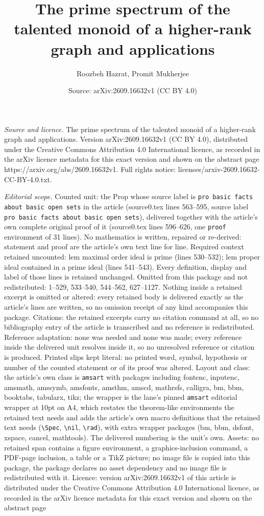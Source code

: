 \documentclass[10pt,a4paper]{amsart}
\title[The prime spectrum of the talented monoid of a higher-rank g]{The prime spectrum of the talented monoid of a higher-rank graph and applications}
\author{Roozbeh Hazrat, Promit Mukherjee}
\date{Source: arXiv:2609.16632v1 (CC BY 4.0)}
\begin{document}
\maketitle

\noindent\emph{Source and licence.} The prime spectrum of the talented monoid of a higher-rank graph and applications. Version arXiv:2609.16632v1 (CC BY 4.0), distributed under the Creative Commons Attribution 4.0 International licence, as recorded in the arXiv licence metadata for this exact version and shown on the abstract page https://arxiv.org/abs/2609.16632v1. Full rights notice: licenses/arxiv-2609.16632-CC-BY-4.0.txt.\par\smallskip

\noindent\textit{Editorial scope.} Counted unit: the Prop whose source label is \texttt{pro basic facts about basic open sets} in the article (source0.tex lines 563--595, source label \texttt{pro basic facts about basic open sets}), delivered together with the article's own complete original proof of it (source0.tex lines 596--626, one \texttt{proof} environment of 31 lines). No mathematics is written, repaired or re-derived: statement and proof are the article's own text line for line. Required context retained uncounted: lem maximal order ideal is prime (lines 530--532); lem proper ideal contained in a prime ideal (lines 541--543). Every definition, display and label of those lines is retained unchanged. Omitted from this package and not redistributed: 1--529, 533--540, 544--562, 627--1127. Nothing inside a retained excerpt is omitted or altered: every retained body is delivered exactly as the article's lines are written, so no omission receipt of any kind accompanies this package. Citations: the retained excerpts carry no citation command at all, so no bibliography entry of the article is transcribed and no reference is redistributed. Reference adaptation: none was needed and none was made; every reference inside the delivered unit resolves inside it, so no unresolved reference or citation is produced. Printed slips kept literal: no printed word, symbol, hypothesis or number of the counted statement or of its proof was altered. Layout and class: the article's own class is \texttt{amsart} with packages including fontenc, inputenc, amsmath, amssymb, amsfonts, amsthm, amscd, mathrsfs, calligra, bm, bbm, booktabs, tabularx, tikz; the wrapper is the lane's pinned \texttt{amsart} editorial wrapper at 10pt on A4, which restates the theorem-like environments the retained text needs and adds the article's own macro definitions that the retained text needs (\texttt{\textbackslash Spec}, \texttt{\textbackslash nil}, \texttt{\textbackslash rad}), with extra wrapper packages (bm, bbm, dsfont, xspace, cancel, mathtools). The delivered numbering is the unit's own. Assets: no retained span contains a figure environment, a graphics-inclusion command, a PDF-page inclusion, a table or a TikZ picture; no image file is copied into this package, the package declares no asset dependency and no image file is redistributed with it. Licence: version arXiv:2609.16632v1 of this article is distributed under the Creative Commons Attribution 4.0 International licence, as recorded in the arXiv licence metadata for this exact version and shown on the abstract page 
\end{document}
